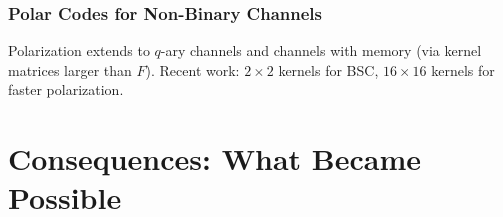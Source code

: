 \subsubsection*{Polar Codes for Non-Binary Channels}
Polarization extends to $q$-ary channels and channels with memory (via kernel matrices larger than $F$). Recent work: $2 \times 2$ kernels for BSC, $16 \times 16$ kernels for faster polarization.

\section{Consequences: What Became Possible}
\label{sec:ec:consequences}

